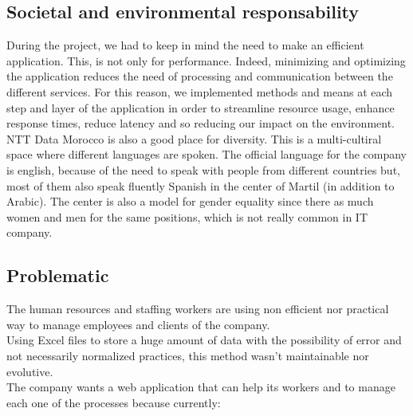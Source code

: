 \documentclass[12pt,a4paper,table,english]{article}
\begin{document}
	\subsection{Societal and environmental responsability}
	
	During the project, we had to keep in mind the need to make an efficient application. This, is not only for performance. Indeed, minimizing and optimizing the application reduces the need of processing and communication between the different services. For this reason, we implemented methods and means at each step and layer of the application in order to streamline resource usage, enhance response times, reduce latency and so reducing our impact on the environment.\\
	
	NTT Data Morocco is also a good place for diversity. This is a multi-cultiral space where different languages are spoken. The official language for the company is english, because of the need to speak with people from different countries but, most of them also speak fluently Spanish in the center of Martil (in addition to Arabic). The center is also a model for gender equality since there as much women and men for the same positions, which is not really common in IT company.
	
	
	\subsection{Problematic}
	
	
	The human resources and staffing workers are using non efficient nor practical way to manage employees and clients of the company.\\
	Using Excel files to store a huge amount of data with the possibility of error and not necessarily normalized practices, this method wasn't maintainable nor evolutive.\\
	
	\noindent The company wants a web application that can help its workers and to manage each one of the processes because currently:
	
\end{document}
